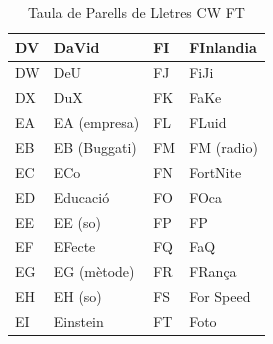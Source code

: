 \begin{table}[ht]
\begin{tabular}{|l|l|l|l|}
        DV & DaVid             & FI & FInlandia             \\ \hline
        DW & DeU               & FJ & FiJi                  \\ \hline
        DX & DuX               & FK & FaKe                  \\ \hline
        EA & EA (empresa)      & FL & FLuid                 \\ \hline
        EB & EB (Buggati)      & FM & FM (radio)            \\ \hline
        EC & ECo               & FN & FortNite              \\ \hline
        ED & Educació          & FO & FOca                  \\ \hline
        EE & EE (so)           & FP & FP                    \\ \hline
        EF & EFecte            & FQ & FaQ                   \\ \hline
        EG & EG (mètode)       & FR & FRança                \\ \hline
        EH & EH (so)           & FS & For Speed             \\ \hline
        EI & Einstein          & FT & Foto                  \\ \hline
    \end{tabular}
    \caption{Taula de Parells de Lletres CW \rightarrow FT}
    \label{tla:lletres-2}
\end{table}


